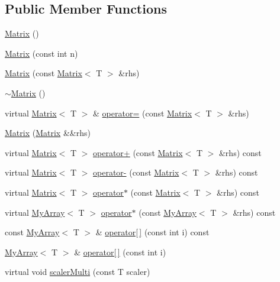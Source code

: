 \subsection*{Public Member Functions}
\begin{DoxyCompactItemize}
\item 
\hyperlink{classMatrix_a9d567e3a121b1be0c3f9c461cab524fe}{Matrix} ()
\item 
\hyperlink{classMatrix_a19ffa179320a60ab6aeb0910f062895f}{Matrix} (const int n)
\item 
\hyperlink{classMatrix_a6a46705243036bfeee78fe2c84c54340}{Matrix} (const \hyperlink{classMatrix}{Matrix}$<$ T $>$ \&rhs)
\item 
\hyperlink{classMatrix_a91aa704de674203e96aece9e1955ccd3}{$\sim$\+Matrix} ()
\item 
virtual \hyperlink{classMatrix}{Matrix}$<$ T $>$ \& \hyperlink{classMatrix_a01990eb2552555d37c83272125be68e6}{operator=} (const \hyperlink{classMatrix}{Matrix}$<$ T $>$ \&rhs)
\item 
\hyperlink{classMatrix_ac503fc6ce19453907fd9ad85133fef39}{Matrix} (\hyperlink{classMatrix}{Matrix} \&\&rhs)
\item 
virtual \hyperlink{classMatrix}{Matrix}$<$ T $>$ \hyperlink{classMatrix_a9db4b4074daa2112eab910c7902fc5d9}{operator+} (const \hyperlink{classMatrix}{Matrix}$<$ T $>$ \&rhs) const 
\item 
virtual \hyperlink{classMatrix}{Matrix}$<$ T $>$ \hyperlink{classMatrix_a06a7f018ed353f0a8239a80ec8403be6}{operator-\/} (const \hyperlink{classMatrix}{Matrix}$<$ T $>$ \&rhs) const 
\item 
virtual \hyperlink{classMatrix}{Matrix}$<$ T $>$ \hyperlink{classMatrix_a358516deb804403fb91256a5a269d1e2}{operator$\ast$} (const \hyperlink{classMatrix}{Matrix}$<$ T $>$ \&rhs) const 
\item 
virtual \hyperlink{classMyArray}{My\+Array}$<$ T $>$ \hyperlink{classMatrix_a70c46247336f74291cc3e1b2fb800a34}{operator$\ast$} (const \hyperlink{classMyArray}{My\+Array}$<$ T $>$ \&rhs) const 
\item 
const \hyperlink{classMyArray}{My\+Array}$<$ T $>$ \& \hyperlink{classMatrix_a7b67f79f397146216c40197642ee4a44}{operator\mbox{[}$\,$\mbox{]}} (const int i) const 
\item 
\hyperlink{classMyArray}{My\+Array}$<$ T $>$ \& \hyperlink{classMatrix_a0d41726a8cfe08d0339f29a5b956f319}{operator\mbox{[}$\,$\mbox{]}} (const int i)
\item 
virtual void \hyperlink{classMatrix_aba8c673e5ca3bcc56a9bad1a1c0fed23}{scaler\+Multi} (const T scaler)

\end{DoxyCompactItemize}

